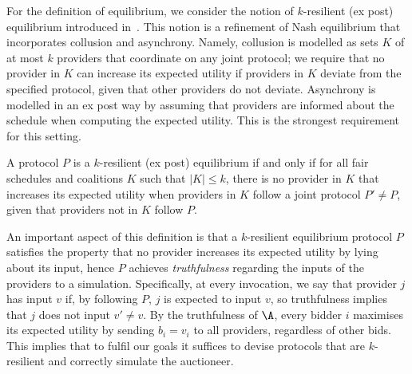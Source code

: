 For the definition of equilibrium, we consider the notion of $k$-resilient 
(ex post) equilibrium introduced in~\cite{Abraham2013}.
This notion is a refinement of Nash equilibrium that incorporates
collusion and asynchrony. Namely, collusion is modelled as sets $K$
of at most $k$ providers that coordinate on any joint protocol;
we require that no provider in $K$ can increase its expected utility
if providers in $K$ deviate from the specified protocol,
given that other providers do not deviate.
Asynchrony is modelled in an ex post way by assuming that providers 
are informed about the schedule when computing the expected utility.
This is the strongest requirement for this setting.

\begin{definition}
A protocol $P$ is a $k$-resilient (ex post) equilibrium if and only if
for all fair schedules and coalitions $K$ such that $|K| \le k$,
there is no provider in $K$ that increases its expected utility
when providers in $K$ follow a joint protocol $P' \ne P$,
given that providers not in $K$ follow $P$.
\end{definition}

An important aspect of this definition is that a $k$-resilient
equilibrium protocol $P$ satisfies the property that no provider increases
its expected utility by lying about its input, hence $P$
achieves \emph{truthfulness} regarding the inputs of the providers to a simulation.
Specifically, at every invocation, we say that provider $j$ has input $v$
if, by following $P$, $j$ is expected to input $v$, so truthfulness implies that $j$ 
does not input $v' \ne v$.
By the truthfulness of $\A$, every bidder $i$ maximises its expected utility
by sending $b_i = v_i$ to all providers, regardless of other bids.
This implies that to fulfil our goals it suffices to devise
protocols that are $k$-resilient and correctly simulate the auctioneer.

